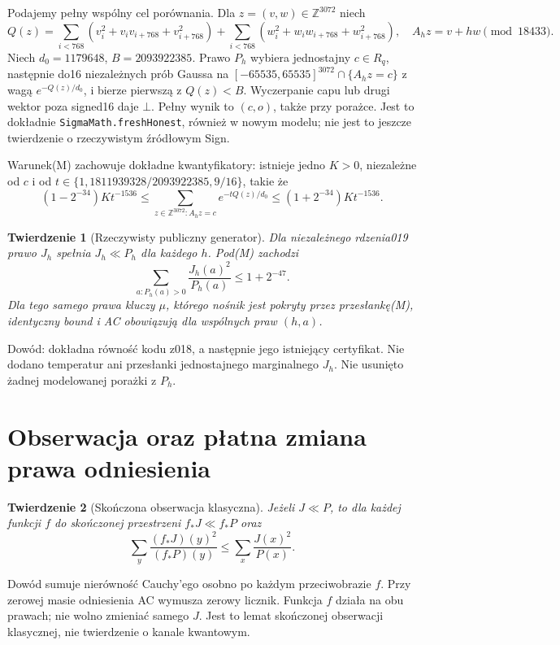\documentclass[11pt,a4paper]{article}
\newcommand{\code}[1]{\nolinkurl{#1}}
\newtheorem{theorem}{Twierdzenie}
\begin{document}
Podajemy pełny wspólny cel porównania. Dla $z=(v,w)\in\mathbb Z^{3072}$
niech
\[
 Q(z)=\sum_{i<768}(v_i^2+v_iv_{i+768}+v_{i+768}^2)
      +\sum_{i<768}(w_i^2+w_iw_{i+768}+w_{i+768}^2),
 \quad A_hz=v+hw\pmod {18433}.
\]
Niech $d_0=1179648$, $B=2093922385$. Prawo $P_h$ wybiera jednostajny
$c\in R_q$, następnie do16 niezależnych prób Gaussa na
$[-65535,65535]^{3072}\cap\{A_hz=c\}$ z wagą $e^{-Q(z)/d_0}$,
i bierze pierwszą z $Q(z)<B$. Wyczerpanie capu lub drugi wektor poza
signed16 daje $\bot$. Pełny wynik to $(c,o)$, także przy porażce.
Jest to dokładnie \code{SigmaMath.freshHonest}, również w nowym modelu;
nie jest to jeszcze twierdzenie o rzeczywistym źródłowym Sign.

Warunek(M) zachowuje dokładne kwantyfikatory: istnieje jedno $K>0$,
niezależne od $c$ i od
$t\in\{1,1811939328/2093922385,9/16\}$, takie że
\[
 (1-2^{-34})Kt^{-1536}\le
 \sum_{z\in\mathbb Z^{3072}:A_hz=c}e^{-tQ(z)/d_0}
 \le(1+2^{-34})Kt^{-1536}.
\]
\begin{theorem}[Rzeczywisty publiczny generator]
Dla niezależnego rdzenia019 prawo $J_h$ spełnia $J_h\ll P_h$ dla każdego
$h$. Pod(M) zachodzi
\[
 \sum_{a:P_h(a)>0}\frac{J_h(a)^2}{P_h(a)}\le1+2^{-47}.
\]
Dla tego samego prawa kluczy $\mu$, którego nośnik jest pokryty przez
przesłankę(M), identyczny bound i AC obowiązują dla wspólnych praw $(h,a)$.
\end{theorem}
Dowód: dokładna równość kodu z018, a następnie jego istniejący certyfikat.
Nie dodano temperatur ani przesłanki jednostajnego marginalnego $J_h$.
Nie usunięto żadnej modelowanej porażki z $P_h$.

\section{Obserwacja oraz płatna zmiana prawa odniesienia}
\begin{theorem}[Skończona obserwacja klasyczna]
Jeżeli $J\ll P$, to dla każdej funkcji $f$ do skończonej przestrzeni
$f_*J\ll f_*P$ oraz
\[
 \sum_y\frac{(f_*J)(y)^2}{(f_*P)(y)}
 \le\sum_x\frac{J(x)^2}{P(x)}.
\]
\end{theorem}
Dowód sumuje nierówność Cauchy'ego osobno po każdym przeciwobrazie $f$.
Przy zerowej masie odniesienia AC wymusza zerowy licznik. Funkcja $f$
działa na obu prawach; nie wolno zmieniać samego $J$. Jest to lemat
skończonej obserwacji klasycznej, nie twierdzenie o kanale kwantowym.
\end{document}
